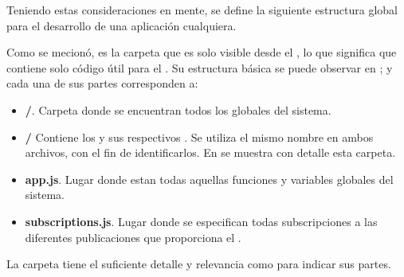Teniendo estas consideraciones en mente, se define la siguiente estructura global para el desarrollo de una aplicación cualquiera.





Como se mecionó, \clientFolder es la carpeta que es solo visible desde el \clientSideAS, lo que significa que contiene solo código útil para el \clientAS. Su estructura básica se puede observar en ; y cada una de sus partes corresponden a:

	\begin{itemize}
		\item
			\textbf{\helpersMETEOR/}. Carpeta donde se encuentran todos los \helpersMETEOR globales del sistema.
		\item
			\textbf{\templatesMETEOR/} Contiene los \templatesMETEOR y sus respectivos \helpersMETEOR. Se utiliza el mismo nombre en ambos archivos, con el fin de identificarlos. En  se muestra con detalle esta carpeta.
		\item
			\textbf{app.js}. Lugar donde estan todas aquellas funciones y variables globales del sistema.
		\item
			\textbf{subscriptions.js}. Lugar donde se especifican todas subscripciones a las diferentes publicaciones que proporciona el \serverAS.
	\end{itemize}



La carpeta 	\templateMETEOR tiene el suficiente detalle y relevancia como para indicar sus partes.

